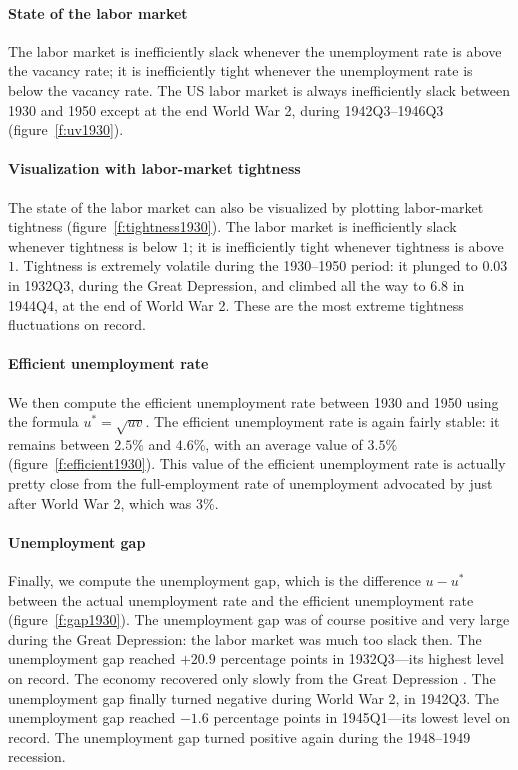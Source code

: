 \documentclass[letterpaper,12pt,leqno]{article}
\begin{document}
\paragraph{State of the labor market} The labor market is inefficiently slack whenever the unemployment rate is above the vacancy rate; it is inefficiently tight whenever the unemployment rate is below the vacancy rate. The US labor market is always inefficiently slack between 1930 and 1950 except at the end World War 2, during 1942Q3--1946Q3 (figure~\ref{f:uv1930}).

\paragraph{Visualization with labor-market tightness} The state of the labor market can also be visualized by plotting labor-market tightness (figure~\ref{f:tightness1930}). The labor market is inefficiently slack whenever tightness is below $1$; it is inefficiently tight whenever tightness is above $1$. Tightness is extremely volatile during the 1930--1950 period: it plunged to $0.03$ in 1932Q3, during the Great Depression, and climbed all the way to $6.8$ in 1944Q4, at the end of World War 2. These are the most extreme tightness fluctuations on record.

\paragraph{Efficient unemployment rate} We then compute the efficient unemployment rate between 1930 and 1950 using the formula $u^* = \sqrt{uv}$. The efficient unemployment rate is again fairly stable: it remains between $2.5\%$ and $4.6\%$, with an average value of $3.5\%$ (figure~\ref{f:efficient1930}). This value of the efficient unemployment rate is actually pretty close from the full-employment rate of unemployment advocated by \citet[p. 21]{B44} just after World War 2, which was $3\%$.

\paragraph{Unemployment gap} Finally, we compute the unemployment gap, which is the difference $u-u^*$ between the actual unemployment rate and the efficient unemployment rate (figure~\ref{f:gap1930}). The unemployment gap was of course positive and very large during the Great Depression: the labor market was much too slack then. The unemployment gap reached $+20.9$ percentage points in 1932Q3---its highest level on record. The economy recovered only slowly from the Great Depression . The unemployment gap finally turned negative during World War 2, in 1942Q3. The unemployment gap reached $-1.6$ percentage points in 1945Q1---its lowest level on record. The unemployment gap turned positive again during the 1948--1949 recession.
\end{document}
